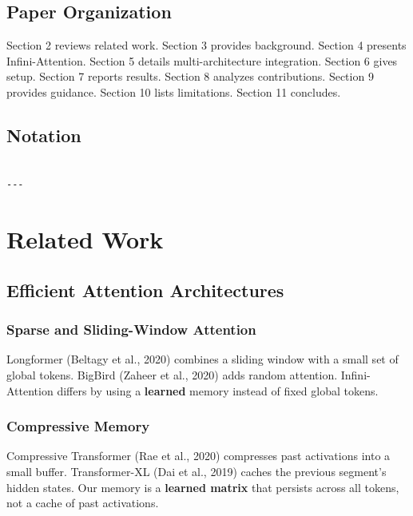 \subsection{Paper Organization}

Section 2 reviews related work. Section 3 provides background. Section 4 
presents Infini-Attention. Section 5 details multi-architecture integration. 
Section 6 gives setup. Section 7 reports results. Section 8 analyzes 
contributions. Section 9 provides guidance. Section 10 lists limitations. 
Section 11 concludes.



\subsection{Notation}

\begin{lstlisting}

---
\end{lstlisting}


\section{Related Work}

\subsection{Efficient Attention Architectures}

\subsubsection{Sparse and Sliding-Window Attention}

Longformer (Beltagy et al., 2020) combines a sliding window with a small 
set of global tokens. BigBird (Zaheer et al., 2020) adds random attention. 
Infini-Attention differs by using a \textbf{learned} memory instead of fixed 
global tokens.

\subsubsection{Compressive Memory}

Compressive Transformer (Rae et al., 2020) compresses past activations into 
a small buffer. Transformer-XL (Dai et al., 2019) caches the previous 
segment's hidden states. Our memory is a \textbf{learned matrix} that persists 
across all tokens, not a cache of past activations.

